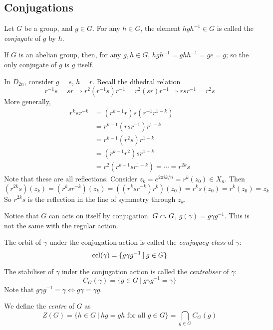 \documentclass[10pt, a4paper, twoside]{report}
\begin{document}
\subsection{Conjugations}
\begin{definition}
    Let \(G\) be a group, and \(g\in G\). For any \(h\in G\), the element \(hgh^{-1}\in G\) is called the \emph{conjugate} of \(g\) by \(h\).
\end{definition}
\begin{example}
    If \(G\) is an abelian group, then, for any \(g,h\in G\), \(hgh^{-1}=ghh^{-1}=ge=g\); so the only conjugate of \(g\) is \(g\) itself.
\end{example}
\begin{example}
    In \(D_{2n}\), consider \(g=s\), \(h=r\). Recall the dihedral relation
    \[r^{-1}s=sr\Rightarrow r^2(r^{-1}s)r^{-1}=r^2(sr)r^{-1}\Rightarrow rsr^{-1}=r^2s\]
    More generally, 
    \begin{align*}
        r^ksr^{-k}&=(r^{k-1}r)s(r^{-1}r^{1-k}) \\
        &=r^{k-1}(rsr^{-1})r^{1-k} \\
        &=r^{k-1}(r^2s)r^{1-k} \\
        &=(r^{k-1}r^2)sr^{1-k} \\
        &=r^2(r^{k-1}sr^{1-k})=\cdots=r^{2k}s
    \end{align*}
    Note that these are all reflections. Consider \(z_k=e^{2\pi ik/n}=r^k(z_0)\in X_n\). Then 
    \[(r^{2k}s)(z_k)=(r^ksr^{-k})(z_k)=((r^ksr^{-k})r^k)(z_0)=r^ks(z_0)=r^k(z_0)=z_k\]
    So \(r^{2k}s\) is the reflection in the line of symmetry through \(z_k\).
    \label{eg:dihedral_conj}
\end{example}
Notice that \(G\) can acts on itself by conjugation. \(G\curvearrowright G\), \(g(\gamma)=g\gamma g^{-1}\). This is not the same with the regular action.
\begin{definition}
    The orbit of \(\gamma\) under the conjugation action is called the \emph{conjugacy class} of \(\gamma\):
    \[\operatorname{ccl}(\gamma)=\{g\gamma g^{-1}\:|\: g\in G\}\]
\end{definition}
\begin{definition}
    The stabiliser of \(\gamma\) inder the conjugation action is called the \emph{centraliser} of \(\gamma\): 
    \[C_G(\gamma)=\{g\in G\:|\:g\gamma g^{-1}=\gamma\}\]
    Note that \(g\gamma g^{-1}=\gamma\Leftrightarrow g\gamma=\gamma g\).
\end{definition}
\begin{definition}
    We define the \emph{centre} of \(G\) as 
    \[Z(G)=\{h\in G\:|\: hg=gh\text{  for all  }g\in G\}=\bigcap_{g\in G}C_G(g)\]
\end{definition}
\end{document}
